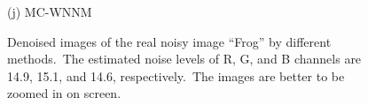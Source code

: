 \documentclass[10pt,onecolumn,letterpaper]{article}
\begin{document}
\begin{figure}[!htbp]
{\begin{minipage}[t]{0.3\textwidth}
{\footnotesize (j) MC-WNNM  }
\end{minipage}
}
\vspace{-1mm}
\caption{Denoised images of the real noisy image ``Frog'' \cite{ncwebsite} by different methods.\ The estimated noise levels of R, G, and B channels are 14.9, 15.1, and 14.6, respectively.\ The images are better to be zoomed in on screen.}
\label{f7}
\end{figure}


\begin{figure}[!htbp]
\centering
\vspace{-2mm}
\vspace{-4mm}
\end{figure}
\end{document}

